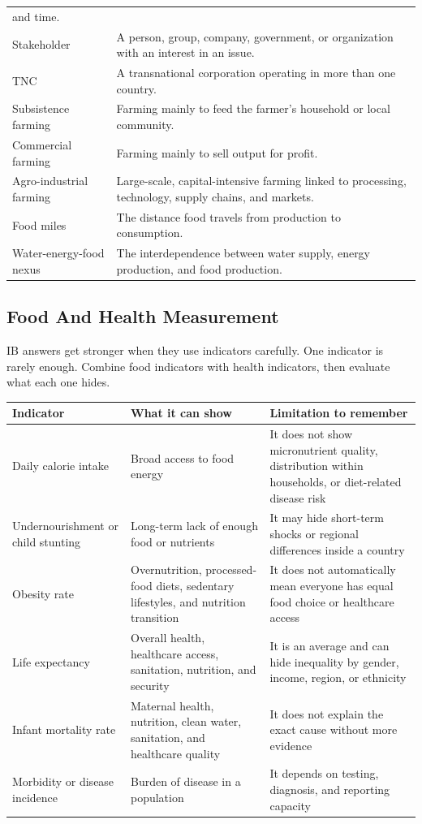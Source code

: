 \documentclass[11pt,a4paper]{article}
\begin{document}
\begin{tabularx}{\textwidth}{L{0.28\textwidth}Y}
and time. \\
Stakeholder & A person, group, company, government, or organization with an
interest in an issue. \\
TNC & A transnational corporation operating in more than one country. \\
Subsistence farming & Farming mainly to feed the farmer's household or local
community. \\
Commercial farming & Farming mainly to sell output for profit. \\
Agro-industrial farming & Large-scale, capital-intensive farming linked to
processing, technology, supply chains, and markets. \\
Food miles & The distance food travels from production to consumption. \\
Water-energy-food nexus & The interdependence between water supply, energy
production, and food production. \\
\bottomrule
\end{tabularx}

\subsection{Food And Health Measurement}

IB answers get stronger when they use indicators carefully. One indicator is
rarely enough. Combine food indicators with health indicators, then evaluate
what each one hides.

\begin{tabularx}{\textwidth}{L{0.23\textwidth}Y Y}
\toprule
\textbf{Indicator} & \textbf{What it can show} & \textbf{Limitation to remember} \\
\midrule
Daily calorie intake & Broad access to food energy & It does not show
micronutrient quality, distribution within households, or diet-related disease
risk \\
Undernourishment or child stunting & Long-term lack of enough food or nutrients
& It may hide short-term shocks or regional differences inside a country \\
Obesity rate & Overnutrition, processed-food diets, sedentary lifestyles, and
nutrition transition & It does not automatically mean everyone has equal food
choice or healthcare access \\
Life expectancy & Overall health, healthcare access, sanitation, nutrition, and
security & It is an average and can hide inequality by gender, income, region,
or ethnicity \\
Infant mortality rate & Maternal health, nutrition, clean water, sanitation,
and healthcare quality & It does not explain the exact cause without more
evidence \\
Morbidity or disease incidence & Burden of disease in a population & It depends
on testing, diagnosis, and reporting capacity \\
\bottomrule
\end{tabularx}
\end{document}
